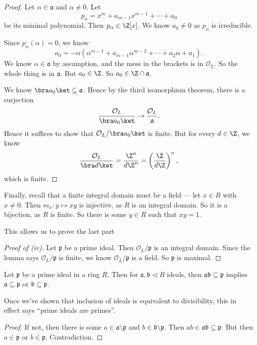 \documentclass[a4paper]{article}
\begin{document}
\begin{proof}
  Let $\alpha \in \mathfrak{a}$ and $\alpha \not= 0$. Let
  \[
    p_\alpha = x^m + a_{m - 1}x^{m - 1} + \cdots + a_0
  \]
  be its minimal polynomial. Then $p_\alpha \in \Z[x]$. We know $a_0 \not= 0$ as $p_\alpha$ is irreducible.

  Since $p_\alpha(\alpha) = 0$, we know
  \[
    a_0 = -\alpha(\alpha^{m - 1} + a_{m - 1} \alpha^{m - 2} + \cdots + a_2 \alpha + a_1).
  \]
  We know $\alpha \in \mathfrak{a}$ by assumption, and the mess in the brackets is in $\mathcal{O}_L$. So the whole thing is in $\mathfrak{a}$. But $a_0 \in \Z$. So $a_0 \in \Z \cap \mathfrak{a}$.

  We know $\bra a_0\ket \subseteq \mathfrak{a}$. Hence by the third isomorphism theorem, there is a surjection
  \[
    \frac{\mathcal{O}_L}{\bra a_0\ket} \rightarrow \frac{\mathcal{O}_L}{\mathfrak{a}}.
  \]
  Hence it suffices to show that $\mathcal{O}_L/\bra a_0\ket$ is finite. But for every $d \in \Z$, we know
  \[
    \frac{\mathcal{O}_L}{\bra d\ket} = \frac{\Z^n}{d\Z^n} = \left(\frac{\Z}{d\Z}\right)^n,
  \]
  which is finite.
\end{proof}

Finally, recall that a finite integral domain must be a field --- let $x \in R$ with $x \not= 0$. Then $m_x: y \mapsto xy$ is injective, as $R$ is an integral domain. So it is a bijection, as $R$ is finite. So there is some $y \in R$ such that $xy = 1$.

This allows us to prove the last part
\begin{proof}[Proof of (iv)]
  Let $\mathfrak{p}$ be a prime ideal. Then $\mathcal{O}_L/\mathfrak{p}$ is an integral domain. Since the lemma says $\mathcal{O}_L/\mathfrak{p}$ is finite, we know $\mathcal{O}_L/\mathfrak{p}$ is a field. So $\mathfrak{p}$ is maximal.
\end{proof}

\begin{lemma}
  Let $\mathfrak{p}$ be a prime ideal in a ring $R$. Then for $\mathfrak{a}, \mathfrak{b}\lhd R$ ideals, then $\mathfrak{a}\mathfrak{b} \subseteq \mathfrak{p}$ implies $\mathfrak{a} \subseteq \mathfrak{p}$ or $\mathfrak{b}\subseteq \mathfrak{p}$.
\end{lemma}
Once we've shown that inclusion of ideals is equivalent to divisibility, this in effect says ``prime ideals are primes''.

\begin{proof}
  If not, then there is some $a \in \mathfrak{a}\setminus \mathfrak{p}$ and $b \in \mathfrak{b}\setminus \mathfrak{p}$. Then $ab \in \mathfrak{a}\mathfrak{b} \subseteq \mathfrak{p}$. But then $a \in \mathfrak{p}$ or $b \in \mathfrak{p}$. Contradiction.
\end{proof}
\end{document}
